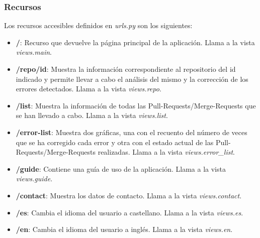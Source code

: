 \documentclass[a4paper, 12pt]{book}
\begin{document}
\subsubsection{Recursos}
\label{subsubsec:django_recursos}
Los recursos accesibles definidos en \textit{urls.py} son los siguientes:
\begin{itemize}
	\item \textbf{/}: Recurso que devuelve la página principal de la aplicación.
	Llama a la vista \textit{views.main}.
	\item \textbf{/repo/id}: Muestra la información correspondiente al repositorio del id indicado y permite llevar a cabo el análisis del mismo y la corrección de los errores detectados.
	Llama a la vista \textit{views.repo}.
	\item \textbf{/list}: Muestra la información de todas las Pull-Requests/Merge-Requests que se han llevado a cabo.
	Llama a la vista \textit{views.list}.
	\item \textbf{/error-list}: Muestra dos gráficas, una con el recuento del número de veces que se ha corregido cada error y otra con el estado actual de las Pull-Requests/Merge-Requests realizadas.
	Llama a la vista \textit{views.error\_list}.
	\item \textbf{/guide}: Contiene una guía de uso de la aplicación. 
	Llama a la vista \textit{views.guide}.
	\item \textbf{/contact}: Muestra los datos de contacto.
	Llama a la vista \textit{views.contact}.
	\item \textbf{/es}: Cambia el idioma del usuario a castellano.
	Llama a la vista \textit{views.es}.
	\item \textbf{/en}: Cambia el idioma del usuario a inglés.
	Llama a la vista \textit{views.en}.
\end{itemize}
\end{document}
